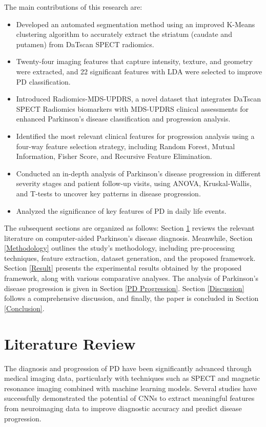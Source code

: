 \documentclass{article}
\begin{document}
The main contributions of this research are:
\begin{itemize}
    \item Developed an automated segmentation method using an improved K-Means clustering algorithm to accurately extract the striatum (caudate and putamen) from DaTscan SPECT radiomics.
    \item Twenty-four imaging features that capture intensity, texture, and geometry were extracted, and 22 significant features with LDA were selected to improve PD classification.  
    \item Introduced Radiomics-MDS-UPDRS, a novel dataset that integrates DaTscan SPECT Radiomics biomarkers with MDS-UPDRS clinical assessments for enhanced Parkinson's disease classification and progression analysis.
    \item Identified the most relevant clinical features for progression analysis using a four-way feature selection strategy, including Random Forest, Mutual Information, Fisher Score, and Recursive Feature Elimination.
    \item Conducted an in-depth analysis of Parkinson's disease progression in different severity stages and patient follow-up visits, using ANOVA, Kruskal-Wallis, and T-tests to uncover key patterns in disease progression.
    \item Analyzed the significance of key features of PD in daily life events.
\end{itemize}

The subsequent sections are organized as follows: Section \ref{Literature Review} reviews the relevant literature on computer-aided Parkinson's disease diagnosis. Meanwhile, Section \ref{Methodology} outlines the study's methodology, including pre-processing techniques, feature extraction, dataset generation, and the proposed framework. Section \ref{Result} presents the experimental results obtained by the proposed framework, along with various comparative analyses. The analysis of Parkinson's disease progression is given in Section \ref{PD Progression}. Section \ref{Discussion} follows a comprehensive discussion, and finally, the paper is concluded in Section \ref{Conclusion}.




\section{Literature Review}
\label{Literature Review}

The diagnosis and progression of PD have been significantly advanced through medical imaging data, particularly with techniques such as SPECT and magnetic resonance imaging combined with machine learning models. Several studies have successfully demonstrated the potential of CNNs to extract meaningful features from neuroimaging data to improve diagnostic accuracy and predict disease progression. 
\end{document}
